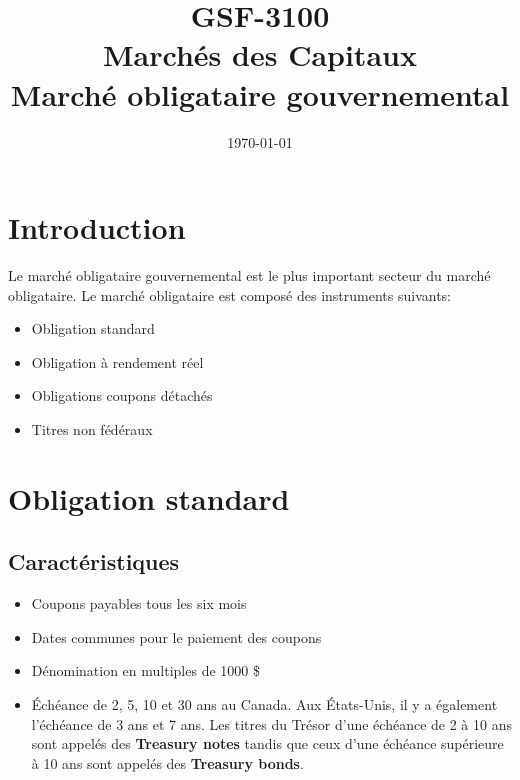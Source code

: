 \documentclass[12pt]{article}
\begin{document}
\begin{titlepage}
\title{GSF-3100 \\ Marchés des Capitaux \\ Marché obligataire gouvernemental}
\date{\today}
\maketitle

\setcounter{page}{0}
\thispagestyle{empty}
\end{titlepage}
\pagebreak \newpage

\tableofcontents
\pagebreak \newpage
\section{Introduction}
Le marché obligataire gouvernemental est le plus important secteur du marché obligataire.  Le marché obligataire est composé des instruments suivants:
\begin{itemize}
\item Obligation standard
\item Obligation à rendement réel
\item Obligations coupons détachés
\item Titres non fédéraux
\end{itemize}
\section{ Obligation standard}
\subsection{Caractéristiques}
\begin{itemize}
\item Coupons payables tous les six mois
\item Dates communes pour le paiement des coupons
\item  Dénomination en multiples de 1000 \$
\item Échéance de 2, 5, 10 et 30 ans au Canada.  Aux États-Unis, il y a également l’échéance de 3 ans et 7 ans.  Les titres du Trésor d’une échéance de 2 à 10 ans sont appelés des \textbf{Treasury notes} tandis que ceux d’une échéance supérieure à 10 ans sont appelés des  \textbf{Treasury bonds}.
\end{itemize}
\newpage
\end{document}
